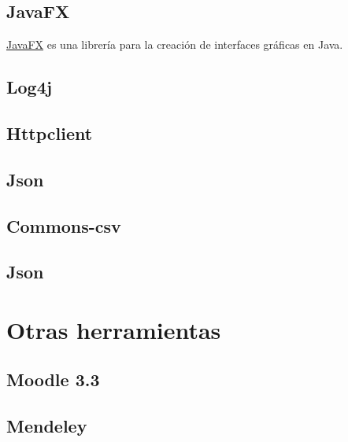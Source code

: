 \subsection{JavaFX}\label{javafx}

\href{http://docs.oracle.com/javase/8/javase-clienttechnologies.htm}{JavaFX}
es una librería para la creación de interfaces gráficas en Java.

\subsection{Log4j}\label{log4j}

\subsection{Httpclient}\label{httpclient}

\subsection{Json}\label{json}

\subsection{Commons-csv}\label{commons-csv}

\subsection{Json}\label{json}





\section{Otras herramientas}\label{otras-herramientas}

\subsection{Moodle 3.3}\label{moodle}

\subsection{Mendeley}\label{mendeley}


